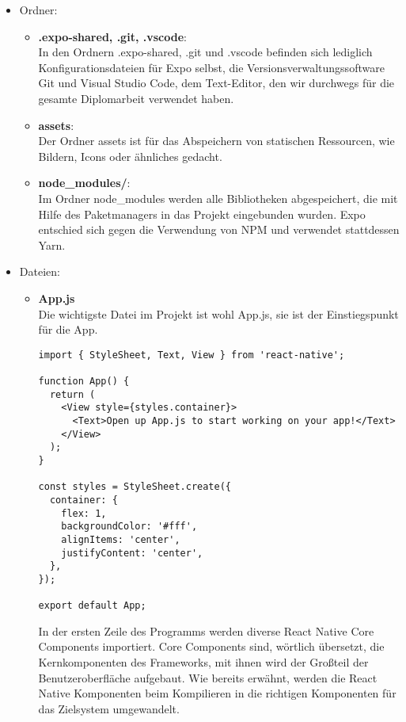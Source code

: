 \begin{itemize}
\item Ordner:
\begin{itemize}
\item \textbf{.expo-shared, .git, .vscode}:\\
In den Ordnern .expo-shared, .git und .vscode befinden sich lediglich Konfigurationsdateien für Expo
selbst, die Versionsverwaltungssoftware Git und Visual Studio Code, dem Text-Editor, den wir
durchwegs für die gesamte Diplomarbeit verwendet haben.

\item \textbf{assets}:\\
Der Ordner assets ist für das Abspeichern von statischen Ressourcen, wie Bildern, Icons oder
ähnliches gedacht.

\item \textbf{node\_modules/}:\\
Im Ordner node\_modules werden alle Bibliotheken abgespeichert, die mit Hilfe des Paketmanagers
in das Projekt eingebunden wurden. Expo entschied sich gegen die Verwendung von NPM und verwendet
stattdessen Yarn.
\end{itemize}

\newpage

\item Dateien:

\begin{itemize}
\item \textbf{App.js}\\
Die wichtigste Datei im Projekt ist wohl App.js, sie ist der Einstiegspunkt für die App.

\begin{lstlisting}
import { StyleSheet, Text, View } from 'react-native';

function App() {
  return (
    <View style={styles.container}>
      <Text>Open up App.js to start working on your app!</Text>
    </View>
  );
}

const styles = StyleSheet.create({
  container: {
    flex: 1,
    backgroundColor: '#fff',
    alignItems: 'center',
    justifyContent: 'center',
  },
});

export default App;
\end{lstlisting}

In der ersten Zeile des Programms werden diverse React Native Core Components importiert. Core
Components sind, wörtlich übersetzt, die Kernkomponenten des Frameworks, mit ihnen wird der Großteil
der Benutzeroberfläche aufgebaut. Wie bereits erwähnt, werden die React Native Komponenten beim
Kompilieren in die richtigen Komponenten für das Zielsystem umgewandelt.


\end{itemize}
\end{itemize}
